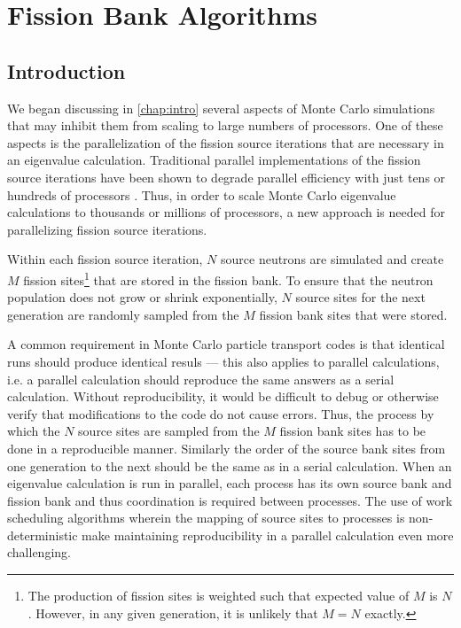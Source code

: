 \chapter{Fission Bank Algorithms}
\label{chap:fission-bank}

\section{Introduction}

We began discussing in \autoref{chap:intro} several aspects of Monte Carlo
simulations that may inhibit them from scaling to large numbers of
processors. One of these aspects is the parallelization of the fission source
iterations that are necessary in an eigenvalue calculation. Traditional parallel
implementations of the fission source iterations have been shown to degrade
parallel efficiency with just tens or hundreds of processors
\cite{physor-hoogenboom-2012}. Thus, in order to scale Monte Carlo eigenvalue
calculations to thousands or millions of processors, a new approach is needed
for parallelizing fission source iterations.

Within each fission source iteration, $N$ source neutrons are simulated and
create $M$ fission sites\footnote{The production of fission sites is weighted
  such that expected value of $M$ is $N$. However, in any given generation, it
  is unlikely that $M=N$ exactly.} that are stored in the fission bank. To
ensure that the neutron population does not grow or shrink exponentially, $N$
source sites for the next generation are randomly sampled from the $M$ fission
bank sites that were stored.

A common requirement in Monte Carlo particle transport codes is that identical
runs should produce identical resuls --- this also applies to parallel
calculations, i.e. a parallel calculation should reproduce the same answers as a
serial calculation. Without reproducibility, it would be difficult to debug or
otherwise verify that modifications to the code do not cause errors. Thus, the
process by which the $N$ source sites are sampled from the $M$ fission bank
sites has to be done in a reproducible manner. Similarly the order of the source
bank sites from one generation to the next should be the same as in a serial
calculation. When an eigenvalue calculation is run in parallel, each process has
its own source bank and fission bank and thus coordination is required between
processes. The use of work scheduling algorithms wherein the mapping of source
sites to processes is non-deterministic make maintaining reproducibility in a
parallel calculation even more challenging.

